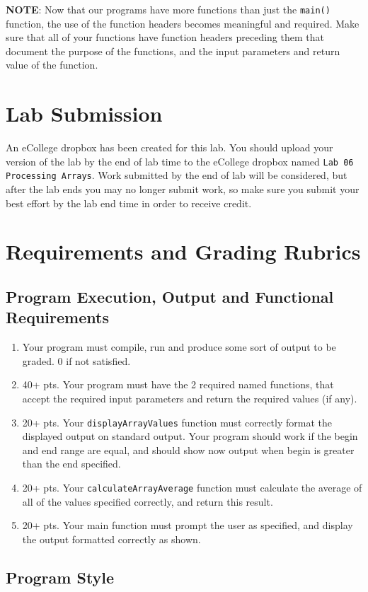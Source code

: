 \documentclass[11pt]{article}
\begin{document}
\textbf{NOTE}: Now that our programs have more functions than just the
\verb~main()~ function, the use of the function headers becomes meaningful
and required.  Make sure that all of your functions have function
headers preceding them that document the purpose of the functions, and
the input parameters and return value of the function.
\section*{Lab Submission}
\label{sec-4}


An eCollege dropbox has been created for this lab.  You should
upload your version of the lab by the end of lab time to the eCollege
dropbox named \verb~Lab 06 Processing Arrays~.  Work submitted by the end
of lab will be considered, but after the lab ends you may no longer
submit work, so make sure you submit your best effort by the lab end
time in order to receive credit.
\section*{Requirements and Grading Rubrics}
\label{sec-5}
\subsection*{Program Execution, Output and Functional Requirements}
\label{sec-5-1}


\begin{enumerate}
\item Your program must compile, run and produce some sort of output to be
  graded. 0 if not satisfied.
\item 40+ pts.  Your program must have the 2 required named functions,
   that accept the required input parameters and return the required
   values (if any).
\item 20+ pts. Your \verb~displayArrayValues~ function must correctly format
   the displayed output on standard output.  Your program should work
   if the begin and end range are equal, and should show now output
   when begin is greater than the end specified.
\item 20+ pts. Your \verb~calculateArrayAverage~ function must calculate the
   average of all of the values specified correctly, and return this
   result.
\item 20+ pts. Your main function must prompt the user as specified, and
   display the output formatted correctly as shown.
\end{enumerate}
\subsection*{Program Style}
\label{sec-5-2}
\end{document}
